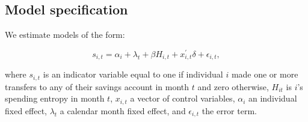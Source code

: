 \subsection{Model specification}%
\label{sub:model_specification}

We estimate models of the form: 

\begin{equation}
    s_{i,t} = \alpha_i + \lambda_t + \beta H_{i,t} + x^\prime_{i,t} \delta +
    \epsilon_{i,t},
\end{equation}

where $s_{i,t}$ is an indicator variable equal to one if individual $i$ made
one or more transfers to any of their savings account in month $t$ and zero
otherwise, $H_{it}$ is $i$'s spending entropy in month $t$,
$x_{i,t}$ a vector of control variables, $\alpha_i$ an individual fixed effect, $\lambda_t$ a calendar
month fixed effect, and $\epsilon_{i, t}$ the error term.
